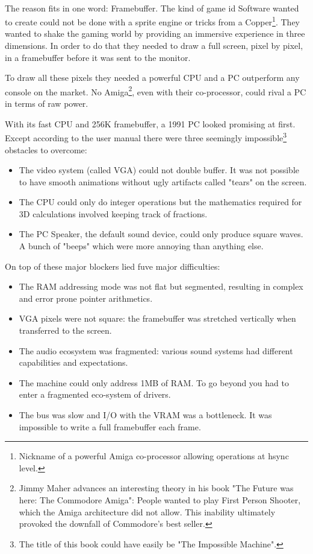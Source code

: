 \\
The reason fits in one word: Framebuffer. The kind of game id Software wanted to create could not be done with a sprite engine or tricks from a Copper\footnote{Nickname of a powerful Amiga co-processor allowing operations at hsync level.}. They wanted to shake the gaming world by providing an immersive experience in three dimensions. In order to do that they needed to draw a full screen, pixel by pixel, in a framebuffer before it was sent to the monitor. \\
\par
To draw all these pixels they needed a powerful CPU and a PC outperform any console on the market. No Amiga\footnote{Jimmy Maher advances an interesting theory in his book "The Future was here: The Commodore Amiga": People wanted to play First Person Shooter, which the Amiga architecture did not allow. This inability ultimately provoked the downfall of Commodore's best seller.}, even with their co-processor, could rival a PC in terms of raw power.
\par


 
With its fast CPU and 256K framebuffer, a 1991 PC looked promising at first. Except according to the user manual there were three seemingly impossible\footnote{The title of this book could have easily be "The Impossible Machine".} obstacles to overcome:\\
\begin{itemize}
\item The video system (called VGA) could not double buffer. It was not possible to have smooth animations without ugly artifacts called "tears" on the screen.
\item The CPU could only do integer operations but the mathematics required for 3D calculations involved keeping track of fractions.
\item The PC Speaker, the default sound device, could only produce square waves. A bunch of "beeps" which were more annoying than anything else.
\end{itemize}
On top of these major blockers lied fuve major difficulties:\\
\begin{itemize}
\item The RAM addressing mode was not flat but segmented, resulting in complex and error prone pointer arithmetics.
\item VGA pixels were not square: the framebuffer was stretched vertically when
transferred to the screen.
\item The audio ecosystem was fragmented: various sound systems had different capabilities and expectations.
\item The machine could only address 1MB of RAM. To go beyond you had to enter a fragmented eco-system of drivers.
\item The bus was slow and I/O with the VRAM was a bottleneck. It was impossible to write a full framebuffer each frame.
\end{itemize}

